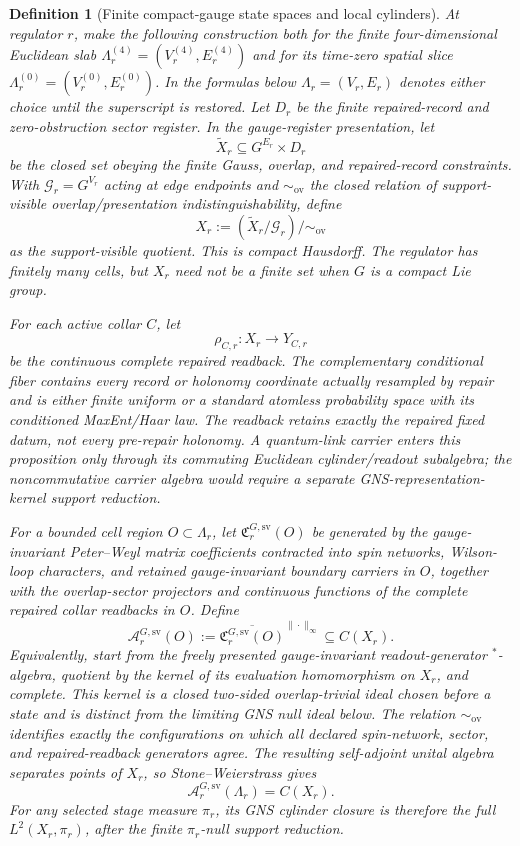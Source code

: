 \documentclass[11pt]{article}
\numberwithin{equation}{section}
\newtheorem{definition}[theorem]{Definition}
\theoremstyle{remark}
\begin{document}
\begin{definition}[Finite compact-gauge state spaces and local cylinders]
\label{def:finite-cylinders}
At regulator \(r\), make the following construction both for the finite four-dimensional
Euclidean slab \(\Lambda_r^{(4)}=(V_r^{(4)},E_r^{(4)})\) and for its time-zero spatial slice
\(\Lambda_r^{(0)}=(V_r^{(0)},E_r^{(0)})\). In the formulas below
\(\Lambda_r=(V_r,E_r)\) denotes either choice until the superscript is restored. Let \(D_r\) be
the finite repaired-record and zero-obstruction sector register. In the gauge-register
presentation, let
\[
\widetilde X_r\subseteq G^{E_r}\times D_r
\]
be the closed set obeying the finite Gauss, overlap, and repaired-record constraints. With
\(\mathcal G_r=G^{V_r}\) acting at edge endpoints and
\(\sim_{\mathrm{ov}}\) the closed relation of support-visible overlap/presentation
indistinguishability, define
\[
X_r:=(\widetilde X_r/\mathcal G_r)/{\sim_{\mathrm{ov}}}
\]
as the support-visible quotient. This is compact Hausdorff. The regulator
has finitely many cells, but \(X_r\) need not be a finite set when \(G\) is a compact Lie group.

For each active collar \(C\), let
\[
\rho_{C,r}:X_r\to Y_{C,r}
\]
be the continuous complete repaired readback. The complementary conditional fiber contains every
record or holonomy coordinate actually resampled by repair and is either finite uniform or a
standard atomless probability space with its conditioned MaxEnt/Haar law. The readback retains
exactly the repaired fixed datum, not every pre-repair holonomy. A quantum-link carrier enters this
proposition only through its commuting Euclidean cylinder/readout subalgebra; the noncommutative
carrier algebra would require a separate GNS-representation-kernel support reduction.

For a bounded cell region \(O\subset\Lambda_r\), let
\(\mathfrak C_r^{G,\mathrm{sv}}(O)\) be generated by the gauge-invariant Peter--Weyl matrix
coefficients contracted into spin networks, Wilson-loop characters, and retained gauge-invariant
boundary carriers in \(O\), together with the overlap-sector projectors and continuous functions
of the complete repaired collar readbacks in \(O\). Define
\[
\mathcal A_r^{G,\mathrm{sv}}(O)
:=\overline{\mathfrak C_r^{G,\mathrm{sv}}(O)}^{\|\cdot\|_\infty}
\subseteq C(X_r).
\]
Equivalently, start from the freely presented gauge-invariant readout-generator \(^*\)-algebra,
quotient by the kernel of its evaluation homomorphism on \(X_r\), and complete. This kernel is a
closed two-sided overlap-trivial ideal chosen before a state and is distinct from the limiting GNS
null ideal below.
The relation \(\sim_{\mathrm{ov}}\) identifies exactly the configurations on which all declared
spin-network, sector, and repaired-readback generators agree. The resulting self-adjoint unital
algebra separates points of \(X_r\), so Stone--Weierstrass gives
\[
\mathcal A_r^{G,\mathrm{sv}}(\Lambda_r)=C(X_r).
\]
For any selected stage measure \(\pi_r\), its GNS cylinder closure is therefore the full
\(L^2(X_r,\pi_r)\), after the finite \(\pi_r\)-null support reduction.


\end{definition}
\end{document}

